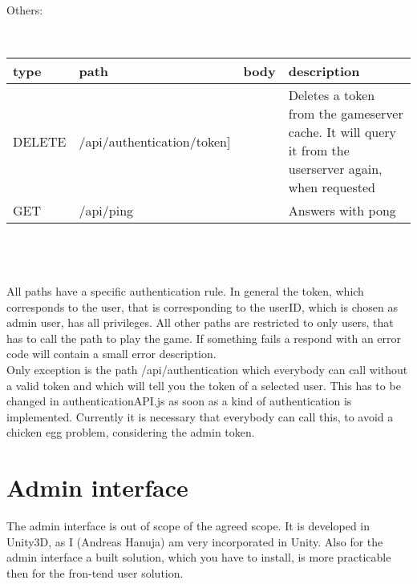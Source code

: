 \noindent Others:
\begin{small}
\\ \hspace*{-1cm} \begin{tabular}{|p{1.5cm}| p{4.5cm} | p{2.5cm} | p{6cm} |}
    \hline
    type & path & body & description \\ \hline
    DELETE & /api/authentication/token] & & Deletes a token from the gameserver cache. It will query it from the userserver again, when requested  \\ \hline
    GET & /api/ping & & Answers with pong \\ \hline


       \end{tabular}
\end{small}\\\\\\
All paths have a specific authentication rule. In general the token, which corresponds to the user, that is corresponding to the userID, which is chosen as admin user, has all privileges. All other paths are restricted to only users, that has to call the path to play the game. If something fails a respond with an error code will contain a small error description.\\
Only exception is the path /api/authentication which everybody can call without a valid token and which will tell you the token of a selected user. This has to be changed in authenticationAPI.js as soon as a kind of authentication is implemented. Currently it is necessary that everybody can call this, to avoid a chicken egg problem, considering the admin token.



\section {Admin interface}
The admin interface is out of scope of the agreed scope. It is developed in Unity3D, as I (Andreas Hanuja) am very incorporated in Unity. Also for the admin interface a built solution, which you have to install, is more practicable then for the fron-tend user solution.\\

